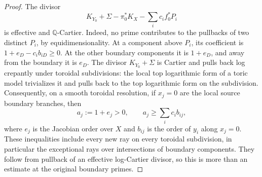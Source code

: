 \begin{proof}
The divisor
\begin{equation}\label{g:cf:effective-log-jacobian}
 K_{Y_0}+\Sigma-\pi_0^*K_X-\sum_i c_i f_0^*P_i
\end{equation}
is effective and $\mathbb Q$-Cartier.  Indeed, no prime contributes to
the pullbacks of two distinct $P_i$, by equidimensionality.  At a
component above $P_i$, its coefficient is $1+e_D-c_i b_{iD}\geq0$.
At the other boundary components it is $1+e_D$, and away from the
boundary it is $e_D$.  The divisor $K_{Y_0}+\Sigma$ is Cartier and
pulls back log crepantly under toroidal subdivisions: the local top
logarithmic form of a toric model trivializes it and pulls back to the
top logarithmic form on the subdivision.  Consequently, on a smooth
toroidal resolution, if $x_j=0$ are the local source boundary branches,
then
\begin{equation}\label{g:cf:orders}
 a_j:=1+e_j>0,\qquad
 a_j\geq\sum_i c_i b_{ij},
\end{equation}
where $e_j$ is the Jacobian order over $X$ and $b_{ij}$ is the order
of $y_i$ along $x_j=0$.  These inequalities include every new ray on every toroidal subdivision,
in particular the exceptional rays over intersections of boundary
components. They follow from pullback of an effective log-Cartier divisor,
so this is more than an estimate at the original boundary primes.


\end{proof}
